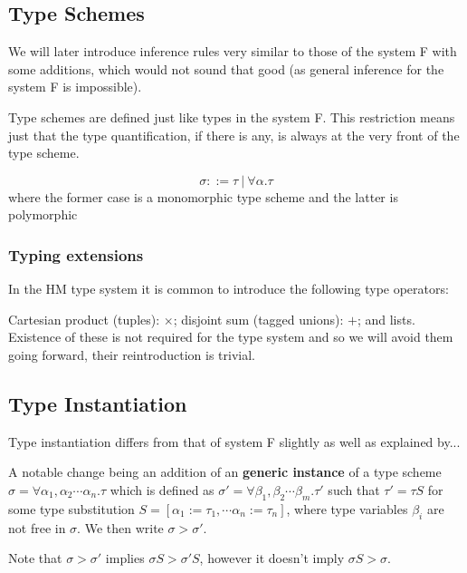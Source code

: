 \subsection{Type Schemes}

We will later introduce inference rules very similar to those of the system F with some additions, which would not sound that good (as general inference for the system F is impossible). %

Type schemes are defined just like types in the system F. This restriction means just that the type quantification, if there is any, is always at the very front of the type scheme.

\begin{defn}
    $$\sigma ::= \tau\ |\ \forall \alpha . \tau$$
    where the former case is a monomorphic type scheme and the latter is polymorphic
\end{defn}

\subsubsection{Typing extensions}

In the HM type system it is common to introduce the following type operators:

Cartesian product (tuples): $\times$; disjoint sum (tagged unions): $+$; and lists. Existence of these is not required for the type system and so we will avoid them going forward, their reintroduction is trivial.

\subsection{Type Instantiation}

Type instantiation differs from that of system F slightly as well as explained  by... %

A notable change being an addition of an \textbf{generic instance} of a type scheme $\sigma = \forall \alpha_1, \alpha_2 \cdots \alpha_n . \tau$ which is defined as $\sigma' = \forall \beta_1, \beta_2 \cdots \beta_m . \tau'$ such that $\tau' = \tau S$ for some type substitution $S = [\alpha_1 := \tau_1, \cdots \alpha_n := \tau_n]$, where type variables $\beta_i$ are not free in $\sigma$. We then write $\sigma > \sigma'$.

Note that $\sigma > \sigma'$ implies $\sigma S > \sigma' S$, however it doesn't imply $\sigma S > \sigma$.

